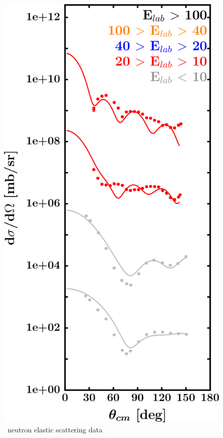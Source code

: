 \begin{figure}[H]
\begin{minipage}{0.45\textwidth}
        \includegraphics[width=1.0\textwidth]{figures/ca48_neutronElastic.png}
        \caption{\caEight\ neutron elastic scattering data}
        \label{DOMFitData_ca48_neutron_elastic}
    \end{minipage}
\end{figure}

